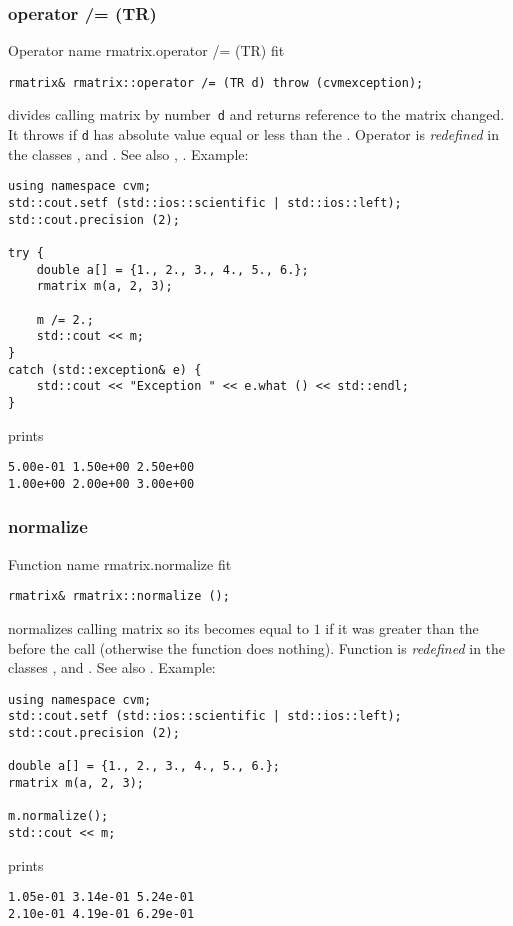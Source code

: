 \subsubsection{operator /= (TR)}
Operator%
\pdfdest name {rmatrix.operator /= (TR)} fit
\begin{verbatim}
rmatrix& rmatrix::operator /= (TR d) throw (cvmexception);
\end{verbatim}
divides  calling matrix by  number~\verb"d"
and returns  reference to
the matrix changed.
It throws  
if \verb"d" has  absolute value equal or less
than the
.
Operator is \emph{redefined} in the classes
, 
and .
See also ,
.
Example:
\begin{Verbatim}
using namespace cvm;
std::cout.setf (std::ios::scientific | std::ios::left);
std::cout.precision (2);

try {
    double a[] = {1., 2., 3., 4., 5., 6.};
    rmatrix m(a, 2, 3);

    m /= 2.;
    std::cout << m;
}
catch (std::exception& e) {
    std::cout << "Exception " << e.what () << std::endl;
}
\end{Verbatim}
prints
\begin{Verbatim}
5.00e-01 1.50e+00 2.50e+00
1.00e+00 2.00e+00 3.00e+00
\end{Verbatim}
\newpage



\subsubsection{normalize}
Function%
\pdfdest name {rmatrix.normalize} fit
\begin{verbatim}
rmatrix& rmatrix::normalize ();
\end{verbatim}
normalizes  calling matrix so its 
becomes equal to $1$ if it was greater than the
before the call (otherwise the function does nothing).
Function is \emph{redefined} in the classes
, 
and .
See also .
Example:
\begin{Verbatim}
using namespace cvm;
std::cout.setf (std::ios::scientific | std::ios::left);
std::cout.precision (2);

double a[] = {1., 2., 3., 4., 5., 6.};
rmatrix m(a, 2, 3);

m.normalize();
std::cout << m;
\end{Verbatim}
prints
\begin{Verbatim}
1.05e-01 3.14e-01 5.24e-01
2.10e-01 4.19e-01 6.29e-01
\end{Verbatim}
\newpage





